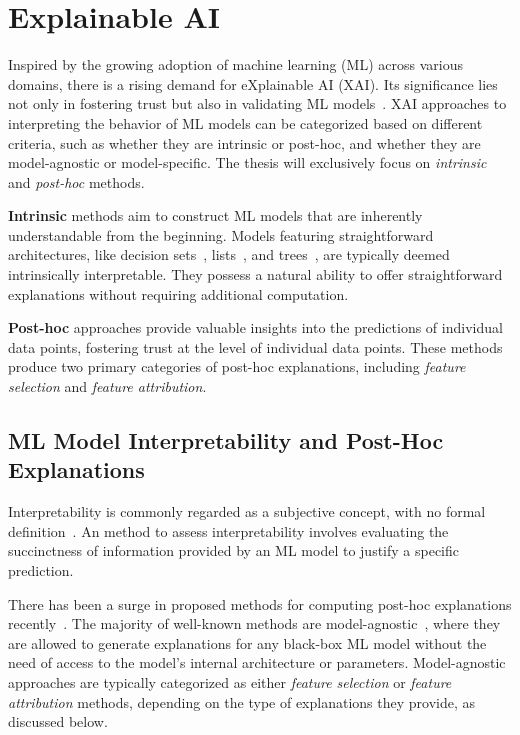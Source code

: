 \section{Explainable AI} \label{sec:xai}

Inspired by the growing adoption of machine learning (ML) across various domains,
there is a rising demand for eXplainable AI (XAI). 
%
Its significance lies not only in fostering trust but also in validating ML
models~\cite{guidotti-acmcs19,swm-arxiv17}.
%
XAI approaches to interpreting the behavior of ML models can be categorized 
based on different criteria, such as whether they are intrinsic or post-hoc, 
and whether they are model-agnostic or model-specific. 
%
The thesis will exclusively focus on \emph{intrinsic} and \emph{post-hoc} methods.

\textbf{Intrinsic} methods aim to construct ML models that are inherently
understandable from the beginning.
%
Models featuring straightforward architectures, like decision sets~\cite{leskovec-kdd16},
lists~\cite{rudin-mpc18}, and trees~\cite{rivest-ipl76}, are typically deemed intrinsically 
interpretable.
%
They possess a natural ability to offer straightforward explanations without 
requiring additional computation.

\textbf{Post-hoc} approaches provide valuable insights into the predictions of 
individual data points, fostering trust at the level of individual data points.
%
These methods produce two primary categories of post-hoc explanations,
including \emph{feature selection} and \emph{feature attribution}.

\subsection{ML Model Interpretability and Post-Hoc Explanations}\label{sec:posexpl}


Interpretability is commonly regarded as a subjective concept, 
with no formal definition~\cite{lipton-cacm18}.
%
An method to assess interpretability involves evaluating the succinctness of information 
provided by an ML model to justify a specific prediction.

There has been a surge in proposed methods for computing post-hoc 
explanations recently~\cite{miller2019explanation,molnar-bk20}. 
%
The majority of well-known methods are model-agnostic~\cite{guestrin-kdd16,lundberg-nips17,guestrin-aaai18}, 
where they are allowed to generate explanations for any black-box ML model without 
the need of access to the model's internal architecture or parameters.
%
Model-agnostic approaches are typically categorized as either \emph{feature selection} or
\emph{feature attribution} methods, depending on the type of explanations they provide, as discussed below.

